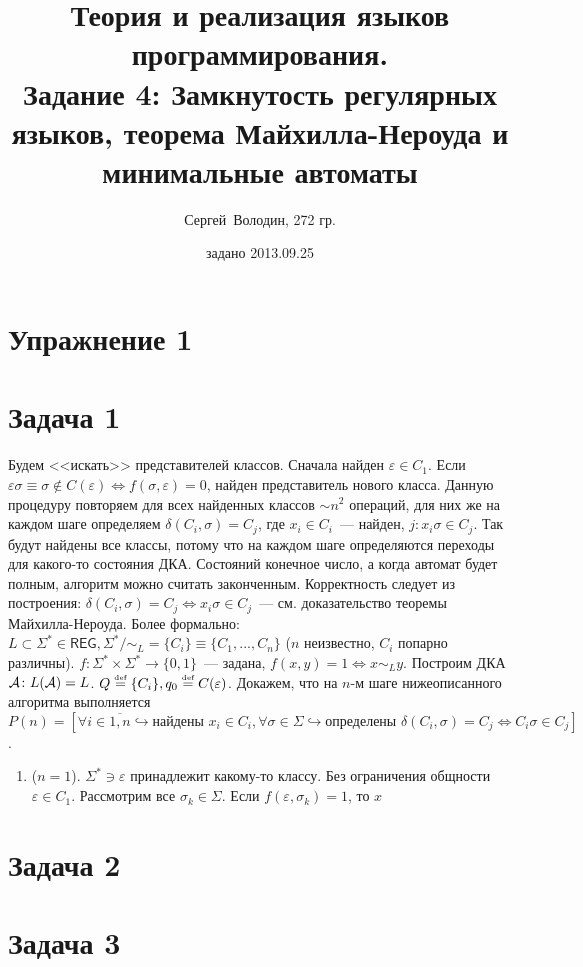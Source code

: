 \documentclass[a4paper]{article}
\title{Теория и реализация языков программирования.\\Задание 4: Замкнутость регулярных языков, теорема Майхилла-Нероуда и минимальные автоматы}
\date{задано 2013.09.25}
\author{Сергей~Володин, 272 гр.}
\def\A{{\cal A}}
\def\REG{{\mathsf{REG}}}
\begin{document}
\maketitle
\section*{Упражнение 1}
\section*{Задача 1}
Будем <<искать>> представителей классов. Сначала найден $\varepsilon\in C_1$. Если $\varepsilon\sigma\equiv\sigma\notin C(\varepsilon)\Leftrightarrow f(\sigma,\varepsilon)=0$, найден представитель нового класса. Данную процедуру повторяем для всех найденных классов $\sim n^2$ операций, для них же на каждом шаге определяем $\delta(C_i,\sigma)=C_j$, где $x_i\in C_i$~--- найден, $j\colon x_i\sigma\in C_j$. Так будут найдены все классы, потому что на каждом шаге определяются переходы для какого-то состояния ДКА. Состояний конечное число, а когда автомат будет полным, алгоритм можно считать законченным. Корректность следует из построения: $\delta(C_i,\sigma)=C_j\Leftrightarrow x_i\sigma\in C_j$~--- см. доказательство теоремы Майхилла-Нероуда.\newline
Более формально: $L\subset\Sigma^*\in\REG,\Sigma^*/\sim_L=\{C_i\}\equiv\{C_1,...,C_n\}$ ($n$ неизвестно, $C_i$ попарно различны). $f\colon \Sigma^*\times\Sigma^*\longrightarrow\{0,1\}$~--- задана, $f(x,y)=1\Leftrightarrow x\sim_Ly$.
Построим ДКА $\A\colon L(\A)=L$.\newline
$Q\overset{\mbox{\tiny def}}{=}\{C_i\}, q_0\overset{\mbox{\tiny def}}{=}C(\varepsilon)$. Докажем, что на $n$-м шаге нижеописанного алгоритма выполняется\newline
$P(n)=[\forall i\in\overline{1,n}\hookrightarrow \mbox{найдены }x_i\in C_i, \forall\sigma\in\Sigma\hookrightarrow\mbox{определены }\delta(C_i,\sigma)=C_j\Leftrightarrow C_i\sigma\in C_j]$.
\begin{enumerate}
\item ($n=1$). $\Sigma^*\ni\varepsilon$ принадлежит какому-то классу. Без ограничения общности $\varepsilon\in C_1$. Рассмотрим все $\sigma_k\in\Sigma$. Если $f(\varepsilon,\sigma_k)=1$, то $x$
\end{enumerate}
\section*{Задача 2}
\section*{Задача 3}
\end{document}
